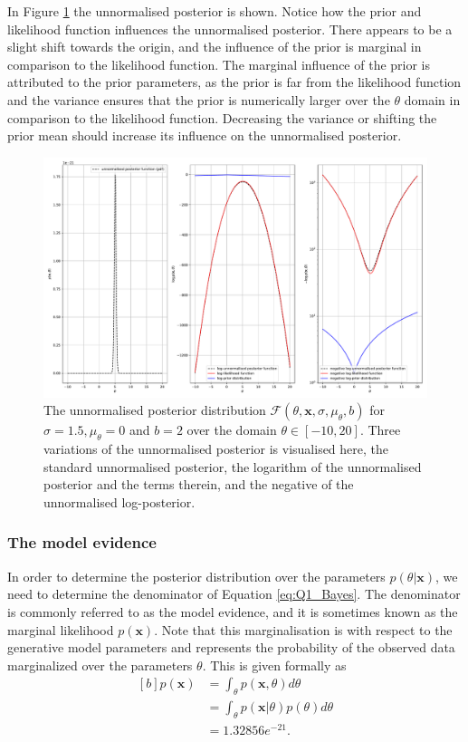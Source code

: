 \documentclass{article}
\begin{document}
In Figure \ref{fig:Q1a_unnorm_posterior} the unnormalised posterior is shown. Notice how the prior and likelihood function influences the unnormalised posterior. There appears to be a slight shift towards the origin, and the influence of the prior is marginal in comparison to the likelihood function. The marginal influence of the prior is attributed to the prior parameters, as the prior is far from the likelihood function and the variance ensures that the prior is numerically larger over the $\theta$ domain in comparison to the likelihood function. Decreasing the variance or shifting the prior mean should increase its influence on the unnormalised posterior.  
\begin{figure}[htb!]
\centering
\includegraphics[scale=0.4]{Q1a_4.pdf}
\caption{The unnormalised posterior distribution $\mathcal{F}(\theta, \mathbf{x}, \sigma, \mu_\theta, b)$ for $\sigma  =1.5, \mu_\theta = 0$ and $b = 2$ over the domain $\theta \in [-10, 20]$. Three variations of the unnormalised posterior is visualised here, the standard unnormalised posterior, the logarithm of the unnormalised posterior and the terms therein, and the negative of the unnormalised log-posterior.}
\label{fig:Q1a_unnorm_posterior}
\end{figure}

\subsubsection{The model evidence}
In order to determine the posterior distribution over the parameters $p(\theta \vert \mathbf{x})$, we need to determine the denominator of Equation \eqref{eq:Q1_Bayes}. The denominator is commonly referred to as the model evidence, and it is sometimes known as the marginal likelihood $p(\mathbf{x})$. Note that this marginalisation is with respect to the generative model parameters and represents the probability of the observed data marginalized over the parameters $\theta$. This is given formally as
\begin{equation}
\begin{aligned}[b]
p(\mathbf{x}) &= \int_\theta p(\mathbf{x}, \theta) d\theta \\
&= \int_\theta p(\mathbf{x} \vert \theta) p(\theta) d\theta \\
&= 1.32856e^{-21}.
\end{aligned}
\end{equation}
\end{document}
